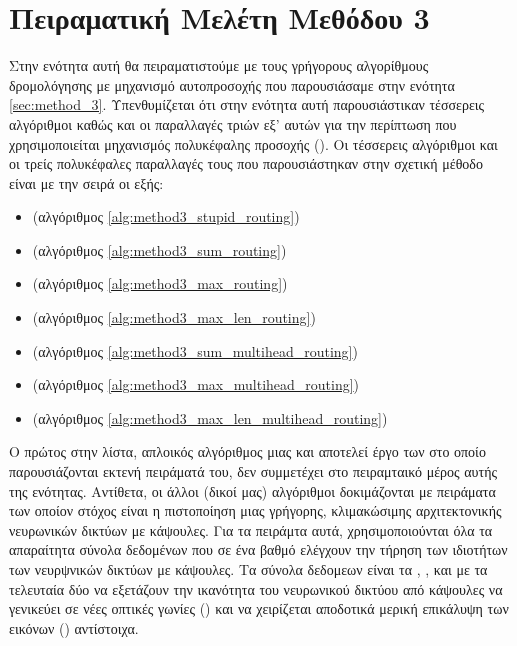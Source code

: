 \section{Πειραματική Μελέτη Μεθόδου 3}
\label{sec:method_3_experiments}
Στην ενότητα αυτή θα πειραματιστούμε με τους γρήγορους αλγορίθμους δρομολόγησης με μηχανισμό αυτοπροσοχής που παρουσιάσαμε στην ενότητα \ref{sec:method_3}. Υπενθυμίζεται ότι στην ενότητα αυτή παρουσιάστικαν τέσσερεις αλγόριθμοι καθώς και οι παραλλαγές τριών εξ' αυτών για την περίπτωση που χρησιμοποιείται μηχανισμός πολυκέφαλης προσοχής (). Οι τέσσερεις αλγόριθμοι και οι τρείς πολυκέφαλες παραλλαγές τους που παρουσιάστηκαν στην σχετική μέθοδο είναι με την σειρά οι εξής: 
\begin{itemize}
    \item {} (αλγόριθμος \ref{alg:method3_stupid_routing})
    \item {} (αλγόριθμος \ref{alg:method3_sum_routing})
    \item {} (αλγόριθμος \ref{alg:method3_max_routing})
    \item {} (αλγόριθμος \ref{alg:method3_max_len_routing})
    \item {} (αλγόριθμος \ref{alg:method3_sum_multihead_routing})
    \item {} (αλγόριθμος \ref{alg:method3_max_multihead_routing})
    \item {} (αλγόριθμος \ref{alg:method3_max_len_multihead_routing})
\end{itemize}

Ο πρώτος στην λίστα, απλοικός αλγόριθμος μιας και αποτελεί έργο των \cite{mazzia2021efficient} στο οποίο παρουσιάζονται εκτενή πειράματά του, δεν συμμετέχει στο πειραμταικό μέρος αυτής της ενότητας. Αντίθετα, οι άλλοι (δικοί μας) αλγόριθμοι δοκιμάζονται με πειράματα των οποίον στόχος είναι η πιστοποίηση μιας γρήγορης, κλιμακώσιμης αρχιτεκτονικής νευρωνικών δικτύων με κάψουλες. Για τα πειράμτα αυτά, χρησιμοποιούνται όλα τα απαραίτητα σύνολα δεδομένων που σε ένα βαθμό ελέγχουν την τήρηση των ιδιοτήτων των νευρψνικών δικτύων με κάψουλες. Τα σύνολα δεδομεων είναι τα , ,  και  με τα τελευταία δύο να εξετάζουν την ικανότητα του νευρωνικού δικτύου από κάψουλες να γενικεύει σε νέες οπτικές γωνίες () και να χειρίζεται αποδοτικά μερική επικάλυψη των εικόνων () αντίστοιχα.\par

